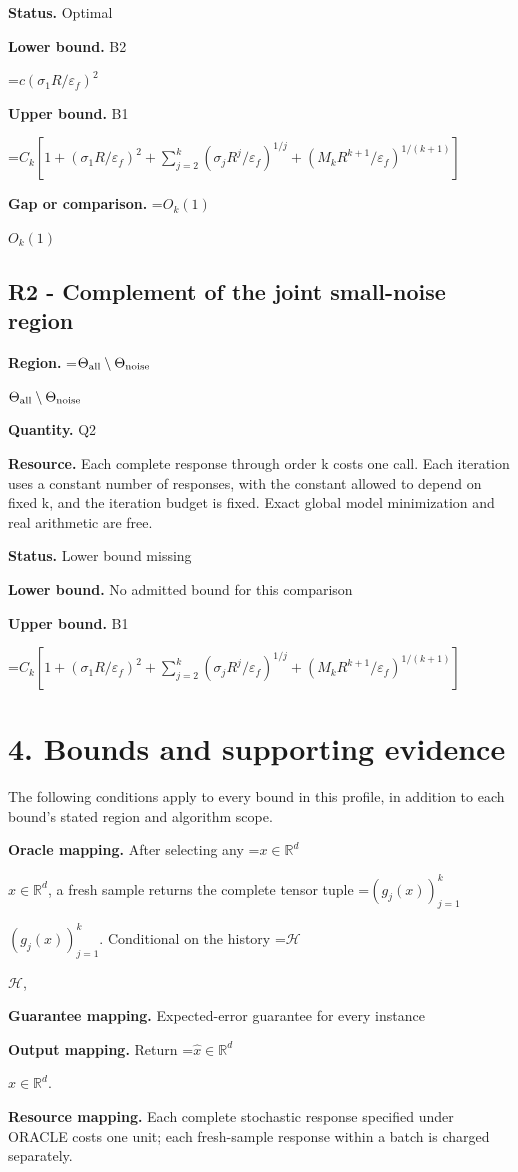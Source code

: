 \documentclass[10pt,a4paper]{article}
\newcommand{\AtlasMath}[1]{\par\begingroup\centering\setbox0=\hbox{$\displaystyle #1$}\ifdim\wd0>1.4\linewidth\typeout{ATLAS WIDE FORMULA: \the\wd0}\fi\ifdim\wd0>\linewidth\resizebox{\linewidth}{!}{\box0}\else\box0\fi\par\endgroup}
\newcommand{\AtlasInlineMath}[1]{\begingroup\setbox0=\hbox{$#1$}\ifdim\wd0>.4\linewidth\endgroup\AtlasMath{#1}\else\endgroup$#1$\fi}
\begin{document}
\textbf{Status.} Optimal

\textbf{Lower bound.} B2

\AtlasMath{c(\sigma_1R/\varepsilon_f)^2}
\textbf{Upper bound.} B1

\AtlasMath{C_k[1+(\sigma_1R/\varepsilon_f)^2+\sum_{j=2}^k(\sigma_jR^j/\varepsilon_f)^{1/j}+(M_kR^{k+1}/\varepsilon_f)^{1/(k+1)}]}
\textbf{Gap or comparison.} \AtlasInlineMath{O_k(1)}

\subsection{R2 - Complement of the joint small-noise region}
\textbf{Region.} \AtlasInlineMath{\Theta_{\rm all}\setminus\Theta_{\rm noise}}

\textbf{Quantity.} Q2

\textbf{Resource.} Each complete response through order k costs one call. Each iteration uses a constant number of responses, with the constant allowed to depend on fixed k, and the iteration budget is fixed. Exact global model minimization and real arithmetic are free.

\textbf{Status.} Lower bound missing

\textbf{Lower bound.} No admitted bound for this comparison

\textbf{Upper bound.} B1

\AtlasMath{C_k[1+(\sigma_1R/\varepsilon_f)^2+\sum_{j=2}^k(\sigma_jR^j/\varepsilon_f)^{1/j}+(M_kR^{k+1}/\varepsilon_f)^{1/(k+1)}]}
\section{4. Bounds and supporting evidence}
The following conditions apply to every bound in this profile, in addition to each bound's stated region and algorithm scope.

\textbf{Oracle mapping.} After selecting any \AtlasInlineMath{x\in\mathbb{R}^d}, a fresh sample returns the complete tensor tuple \AtlasInlineMath{(g_j(x))_{j=1}^k}. Conditional on the history \AtlasInlineMath{\mathcal{H}},

\textbf{Guarantee mapping.} Expected-error guarantee for every instance

\textbf{Output mapping.} Return \AtlasInlineMath{\widehat{x}\in \mathbb{R}^d}.

\textbf{Resource mapping.} Each complete stochastic response specified under ORACLE costs one unit; each fresh-sample response within a batch is charged separately.
\end{document}
